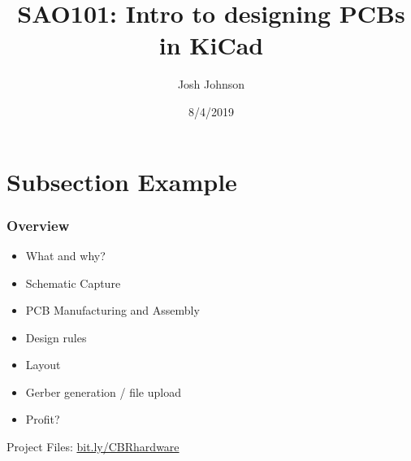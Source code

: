 \documentclass[t]{beamer}
\title[SAO101]{SAO101: Intro to designing PCBs in KiCad} %
\author{Josh Johnson} %
\institute[] %
{ \\ %
\medskip
\textit{} %
}
\date{8/4/2019} %
\begin{document}
\begin{frame}
\titlepage %
\end{frame}


\section{Subsection Example} %

\begin{frame}
\frametitle{Overview}
\begin{itemize}
\item What and why?
\item Schematic Capture
\item PCB Manufacturing and Assembly
\item Design rules
\item Layout 
\item Gerber generation / file upload
\item Profit?
\end{itemize}
\vspace{35mm}
Project Files: \url{bit.ly/CBRhardware}\\
\end{frame}

\end{document}

